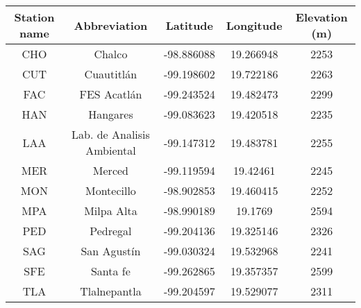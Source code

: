 \begin{tabular}{ccccc} \hline
Station name& Abbreviation&Latitude&Longitude &Elevation (m)\\ \hline
CHO&Chalco&-98.886088&19.266948&2253\\ 
CUT&Cuautitlán&-99.198602&19.722186&2263\\ 
FAC&FES Acatlán&-99.243524&19.482473&2299\\ 
HAN&Hangares&-99.083623&19.420518&2235\\ 
LAA&Lab. de Analisis Ambiental&-99.147312&19.483781&2255\\ 
MER&Merced&-99.119594&19.42461&2245\\ 
MON&Montecillo&-98.902853&19.460415&2252\\ 
MPA&Milpa Alta&-98.990189&19.1769&2594\\ 
PED&Pedregal&-99.204136&19.325146&2326\\ 
SAG&San Agustín&-99.030324&19.532968&2241\\ 
SFE&Santa fe&-99.262865&19.357357&2599\\ 
TLA&Tlalnepantla&-99.204597&19.529077&2311\\ \hline
\end{tabular}
